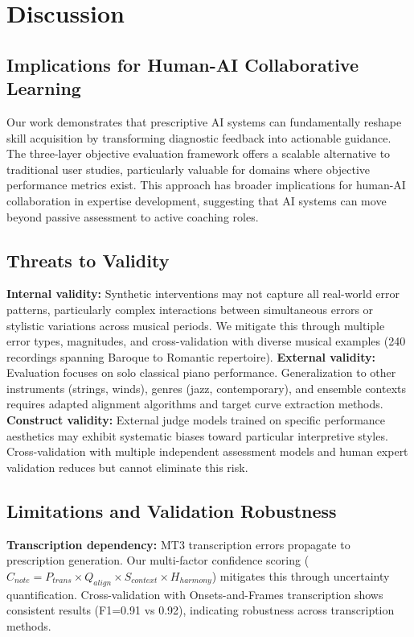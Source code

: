 \section{Discussion}
\subsection{Implications for Human-AI Collaborative Learning}
Our work demonstrates that prescriptive AI systems can fundamentally reshape skill acquisition by transforming diagnostic feedback into actionable guidance. The three-layer objective evaluation framework offers a scalable alternative to traditional user studies, particularly valuable for domains where objective performance metrics exist. This approach has broader implications for human-AI collaboration in expertise development, suggesting that AI systems can move beyond passive assessment to active coaching roles.

\subsection{Threats to Validity}
\textbf{Internal validity:} Synthetic interventions may not capture all real-world error patterns, particularly complex interactions between simultaneous errors or stylistic variations across musical periods. We mitigate this through multiple error types, magnitudes, and cross-validation with diverse musical examples (240 recordings spanning Baroque to Romantic repertoire).
\textbf{External validity:} Evaluation focuses on solo classical piano performance. Generalization to other instruments (strings, winds), genres (jazz, contemporary), and ensemble contexts requires adapted alignment algorithms and target curve extraction methods.
\textbf{Construct validity:} External judge models trained on specific performance aesthetics may exhibit systematic biases toward particular interpretive styles. Cross-validation with multiple independent assessment models and human expert validation reduces but cannot eliminate this risk.

\subsection{Limitations and Validation Robustness}
\textbf{Transcription dependency:} MT3 transcription errors propagate to prescription generation. Our multi-factor confidence scoring ($C_{note} = P_{trans} \times Q_{align} \times S_{context} \times H_{harmony}$) mitigates this through uncertainty quantification. Cross-validation with Onsets-and-Frames transcription shows consistent results (F1=0.91 vs 0.92), indicating robustness across transcription methods.

